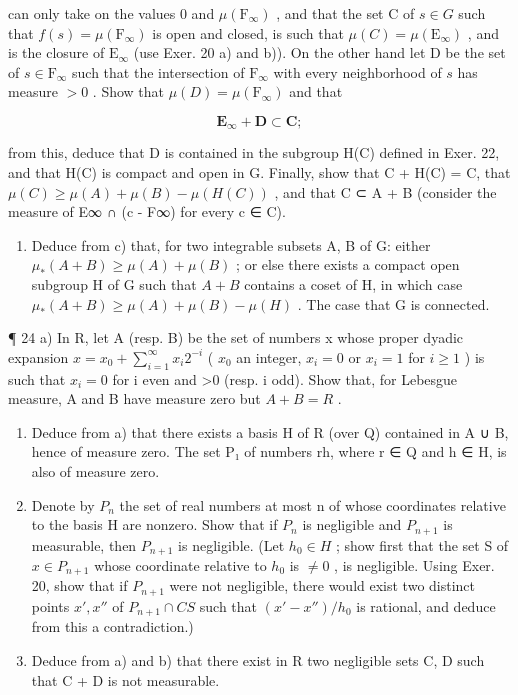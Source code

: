 can only take on the values 0 and \(\mu(\mathrm{F}_{\infty})\) , and that the set C of \(s \in G\) such that \(f(s) = \mu(\mathrm{F}_{\infty})\) is open and closed, is such that \(\mu(C) = \mu(\mathrm{E}_{\infty})\) , and is the closure of \(\mathrm{E}_{\infty}\) (use Exer. 20 a) and b)). On the other hand let D be the set of \(s \in \mathrm{F}_{\infty}\) such that the intersection of \(\mathrm{F}_{\infty}\) with every neighborhood of \(s\) has measure \(>0\) . Show that \(\mu(D) = \mu(\mathrm{F}_{\infty})\) and that

\[
\mathbf {E} _ {\infty} + \mathbf {D} \subset \mathbf {C};
\]

from this, deduce that D is contained in the subgroup H(C) defined in Exer. 22, and that H(C) is compact and open in G. Finally, show that C + H(C) = C, that \(\mu(C) \geqslant \mu(A) + \mu(B) - \mu(H(C))\) , and that C ⊂ A + B (consider the measure of E∞ ∩ (c - F∞) for every c ∈ C).

\begin{enumerate}
\def\labelenumi{\alph{enumi})}
\setcounter{enumi}{3}
\tightlist
\item
  Deduce from c) that, for two integrable subsets A, B of G: either \(\mu_{*}(A+B)\geqslant\mu(A)+\mu(B)\) ; or else there exists a compact open subgroup H of G such that \(A+B\) contains a coset of H, in which case \(\mu_{*}(A+B)\geqslant\mu(A)+\mu(B)-\mu(H)\) . The case that G is connected.
\end{enumerate}

¶ 24 a) In R, let A (resp. B) be the set of numbers x whose proper dyadic expansion \(x = x_0 + \sum_{i=1}^{\infty} x_i 2^{-i}\) ( \(x_0\) an integer, \(x_i = 0\) or \(x_i = 1\) for \(i \geqslant 1\) ) is such that \(x_{i}=0\) for i even and \textgreater0 (resp. i odd). Show that, for Lebesgue measure, A and B have measure zero but \(A+B=R\) .

\begin{enumerate}
\def\labelenumi{\alph{enumi})}
\setcounter{enumi}{1}
\item
  Deduce from a) that there exists a basis H of R (over Q) contained in A ∪ B, hence of measure zero. The set P₁ of numbers rh, where r ∈ Q and h ∈ H, is also of measure zero.
\item
  Denote by \(P_{n}\) the set of real numbers at most n of whose coordinates relative to the basis H are nonzero. Show that if \(P_{n}\) is negligible and \(P_{n+1}\) is measurable, then \(P_{n+1}\) is negligible. (Let \(h_{0} \in H\) ; show first that the set S of \(x \in P_{n+1}\) whose coordinate relative to \(h_{0}\) is \(\neq 0\) , is negligible. Using Exer. 20, show that if \(P_{n+1}\) were not negligible, there would exist two distinct points \(x', x''\) of \(P_{n+1} \cap CS\) such that \((x' - x'') / h_{0}\) is rational, and deduce from this a contradiction.)
\item
  Deduce from a) and b) that there exist in R two negligible sets C, D such that C + D is not measurable.
\end{enumerate}

